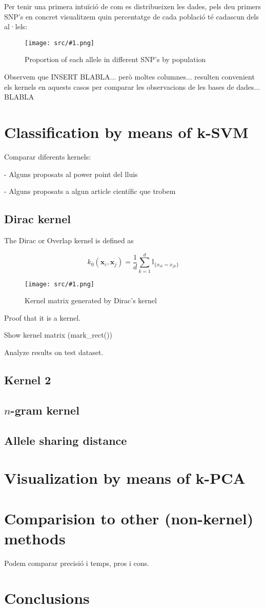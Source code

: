 \documentclass[a4paper, 11pt]{article}
\newcommand{\Figure}[3]{
	\begin{figure}[!h]
	\centering
	\texttt{[image: src/\#1.png]}
	\caption{#3}
	\label{fig:#1}
	\end{figure}
}
\theoremstyle{definition}
\theoremstyle{remark}
\begin{document}
Per tenir una primera intuïció de com es distribueixen les dades, pels deu primers SNP’s en concret visualitzem quin percentatge de cada població té cadascun dels al·lels:

\Figure{allele_distribution}{14}{Proportion of each allele in different SNP's by population}


Observem que INSERT BLABLA... però moltes columnes... resulten convenient els kernels en aquests casos per comparar les observacions de les bases de dades... BLABLA

\section{Classification by means of k-SVM}

Comparar diferents kernels:

- Alguns proposats al power point del lluis

- Alguns proposats a algun article científic que trobem


\subsection{Dirac kernel}

The Dirac or Overlap kernel is defined as

\begin{equation*}
    k_0(\mathbf{x}_i, \mathbf{x}_j) = \frac{1}{d}\sum_{k=1}^{d} \mathbb{I}_{\{x_{ik} = x_{jk}\}}
\end{equation*}

\Figure{dirac_kernel}{10}{Kernel matrix generated by Dirac's kernel}


Proof that it is a kernel.

Show kernel matrix (mark\_rect())

Analyze results on test dataset.

\subsection{Kernel 2}

\subsection{$n$-gram kernel}

\subsection{Allele sharing distance}


\section{Visualization by means of k-PCA}



\section{Comparision to other (non-kernel) methods}
Podem comparar precisió i temps, pros i cons.

\section{Conclusions}

\newpage

\printbibliography[
heading=bibintoc,
title={References}
]
\end{document}
